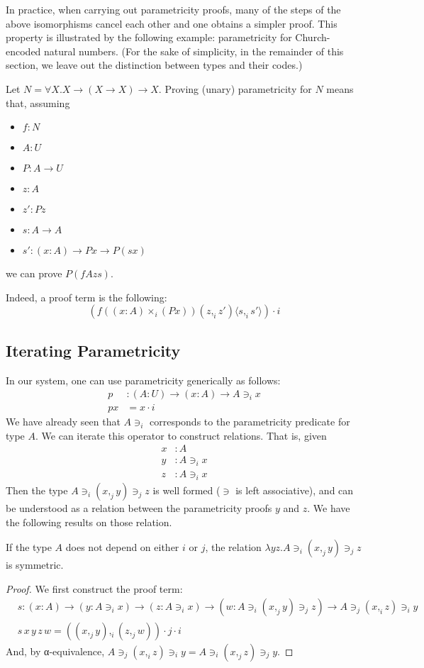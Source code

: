 \documentclass[english]{PaperTools/latex/lipics}
\newcommand\CP[3]{(#2,_{#1} #3)}
\newcommand\CTimes[2]{(#2) ×_{#1}}
\newcommand\param[1]{\!\cdot\!#1}
\newcommand\op[1]{∋_{#1}}
\newcommand\fp[3]{⟨#2 ,_{#1} #3⟩}
\begin{document}
In practice, when carrying out parametricity proofs, many of the steps
of the above isomorphisms cancel each other and one obtains a simpler
proof. This property is illustrated by the following example:
parametricity for Church-encoded natural numbers.
(For the sake of simplicity, in the remainder of this section, we leave out the
distinction between types and their codes.)
\begin{example}
Let $N = ∀X. X → (X → X) → X$.
Proving (unary) parametricity for $N$ means that, assuming
\begin{itemize}
\item $f : N$
\item $A : U$
\item $P : A → U$
\item $z : A$
\item $z' : P z$
\item $s : A → A$
\item $s' : (x:A) → P x → P (s x)$
\end{itemize}
we can prove $P (f A z s)$.

Indeed, a proof term is the following:
%
\[
(f (\CTimes i {x:A} (P x)) \CP i z {z'} \fp i s {s'}) \param i
\]
\end{example}

\subsection{Iterating Parametricity}
In our system, one can use parametricity generically as follows:
\begin{align*}
p &: (A:U) → (x:A) → A \op i x\\
p x &= x\param i
\end{align*}
We have already seen that $A \op i $ corresponds to the parametricity
predicate for type $A$. We can iterate this operator to construct
relations. That is, given
\begin{align*}
  x & :A \\
  y & : A \op i x\\
  z & : A \op i x
\end{align*}
Then the type $A \op i \CP j x y \op j z$ is well formed ($∋$ is left
associative), and can be understood as a relation
between the parametricity proofs $y$ and $z$. We have the following results on those relation.
\begin{theorem}
If the type $A$ does not depend on either $i$ or $j$, the relation $λy z. A \op i \CP j x y \op j z$ is symmetric.
\end{theorem}
\begin{proof}
  We first construct the proof term:
  \begin{align*}
    &s : (x:A) → (y : A \op i x) → (z : A \op i x) → (w : A \op i \CP j x y \op j z) → A \op j \CP i x z \op i y \\
    &s\, x\, y\, z\, w = \CP i {\CP j x y}{\CP j z w} \param j \param i
  \end{align*}
  And, by α-equivalence, $A \op j \CP i x z \op i y = A \op i \CP j x z \op j y$.
\end{proof}
\end{document}
